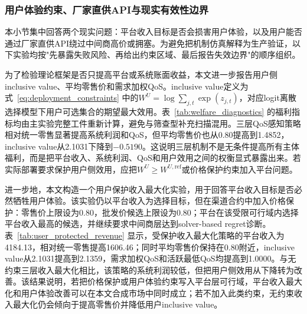 \documentclass[UTF8,11pt]{ctexart}
\begin{document}
\subsubsection{用户体验约束、厂家直供API与现实有效性边界}
\label{sec:realism_validation}

本小节集中回答两个现实问题：平台收入目标是否会损害用户体验，以及用户能否通过厂家直供API绕过中间商高价或拥塞。为避免把机制仿真解释为生产验证，以下实验均按"先暴露失败风险、再给出约束区域、最后报告失效边界"的顺序组织。

为了检验理论框架是否只提高平台或系统账面收益，本文进一步报告用户侧inclusive value、平均零售价和需求加权QoS。inclusive value定义为式~\eqref{eq:deployment_constraints} 中的$W^U=\log\sum_{j,t}\exp(z_{j,t})$，对应logit离散选择模型下用户可选集合的期望最大效用。表~\ref{tab:welfare_diagnostics} 的福利指标均由主实验完整工件重新计算，避免与筛查型补充扫描混用。三层QoS感知策略相对统一零售显著提高系统利润和QoS，但平均零售价也从0.80提高到1.4852，inclusive value从2.1031下降到$-0.5190$。这说明三层机制不是无条件提高所有主体福利，而是把平台收入、系统利润、QoS和用户效用之间的权衡显式暴露出来。若实际部署要求保护用户侧效用，应把$W^U\ge W^{U,\mathrm{ref}}$或价格保护约束加入平台问题。

\begin{table}[H]
\centering
\caption{用户福利与服务质量诊断}
\label{tab:welfare_diagnostics}
\small
{}
\end{table}

进一步地，本文构造一个用户保护收入最大化实验，用于回答平台收入目标是否必然牺牲用户体验。该实验仍以平台收入为选择目标，但在渠道合约中加入价格保护：零售价上限设为0.80，批发价候选上限设为0.80；平台在该受限可行域内选择平台收入最高的候选，并继续要求中间商层达到solver-based regret诊断。表~\ref{tab:user_protected_revenue} 显示，受保护收入最大化策略的平台收入为4184.13，相对统一零售提高1606.46；同时平均零售价保持在0.80附近，inclusive value从2.1031提高到2.1359，需求加权QoS和活跃最低QoS均提高到1.0000。与无约束三层收入最大化相比，该策略的系统利润较低，但把用户侧效用从下降转为改善。该结果说明，若把价格保护或用户体验约束写入平台层可行域，平台收入最大化和用户体验改善可以在本文合成市场中同时成立；若不加入此类约束，无约束收入最大化仍会倾向于提高零售价并降低用户inclusive value。
\end{document}
